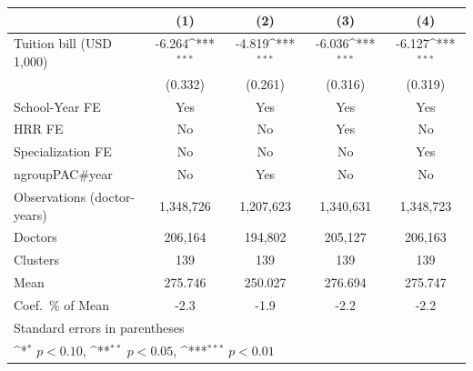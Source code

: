 {
\def\sym#1{\ifmmode^{#1}\else\(^{#1}\)\fi}
\begin{tabular}{l*{4}{c}}
\hline\hline
                    &\multicolumn{1}{c}{(1)}         &\multicolumn{1}{c}{(2)}         &\multicolumn{1}{c}{(3)}         &\multicolumn{1}{c}{(4)}         \\
\hline
Tuition bill (USD 1,000)&      -6.264\sym{***}&      -4.819\sym{***}&      -6.036\sym{***}&      -6.127\sym{***}\\
                    &     (0.332)         &     (0.261)         &     (0.316)         &     (0.319)         \\
[1em]
School-Year FE      &         Yes         &         Yes         &         Yes         &         Yes         \\
[1em]
HRR FE              &          No         &          No         &         Yes         &          No         \\
[1em]
Specialization FE   &          No         &          No         &          No         &         Yes         \\
[1em]
ngroupPAC#year      &          No         &         Yes         &          No         &          No         \\
\hline
Observations (doctor-years)&   1,348,726         &   1,207,623         &   1,340,631         &   1,348,723         \\
Doctors             &     206,164         &     194,802         &     205,127         &     206,163         \\
Clusters            &         139         &         139         &         139         &         139         \\
Mean                &     275.746         &     250.027         &     276.694         &     275.747         \\
Coef.\ \% of Mean   &        -2.3         &        -1.9         &        -2.2         &        -2.2         \\
\hline\hline
\multicolumn{5}{l}{\footnotesize Standard errors in parentheses}\\
\multicolumn{5}{l}{\footnotesize \sym{*} \(p<0.10\), \sym{**} \(p<0.05\), \sym{***} \(p<0.01\)}\\
\end{tabular}
}
